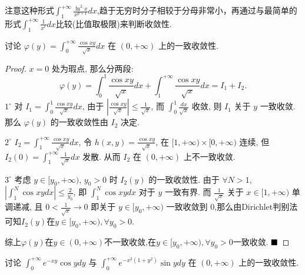 \documentclass[lang=cn,newtx,10pt,scheme=chinese]{elegantbook}
\begin{document}
\begin{note}
    注意这种形式$\int_{1}^{+\infty} \frac{\ln^2 x}{x^{p+1}} dx$,趋于无穷时分子相较于分母非常小，再通过与最简单的形式$\int_{1}^{+\infty} \frac{1}{x^{r}} dx$比较(比值取极限)来判断收敛性.
\end{note}

\begin{example}
讨论 $\varphi(y) = \int_{0}^{+\infty} \frac{\cos xy}{\sqrt{x}} dx$ 在 $(0, +\infty)$ 上的一致收敛性.
\end{example}

\begin{proof}
$x=0$ 处为瑕点, 那么分两段:
$$ \varphi(y) = \int_{0}^{1} \frac{\cos xy}{\sqrt{x}} dx + \int_{1}^{+\infty} \frac{\cos xy}{\sqrt{x}} dx = I_1 + I_2. $$
$1^{\circ}$ 对 $I_1 = \int_{0}^{1} \frac{\cos xy}{\sqrt{x}} dx$, 由于 $|\frac{\cos xy}{\sqrt{x}}| \le \frac{1}{\sqrt{x}}$, 而 $\int_{0}^{1} \frac{dx}{\sqrt{x}}$ 收敛, 则 $I_1$ 关于 $y$ 一致收敛.
那么 $\varphi(y)$ 的一致收敛性由 $I_2$ 决定.

$2^{\circ}$ $I_2 = \int_{1}^{+\infty} \frac{\cos xy}{\sqrt{x}} dx$, 令 $h(x,y) = \frac{\cos xy}{\sqrt{x}}$, 在 $[1, +\infty) \times [0, +\infty)$ 连续, 但 $I_2(0) = \int_{1}^{+\infty} \frac{1}{\sqrt{x}} dx$ 发散.
从而 $I_2$ 在 $(0, +\infty)$ 上不一致收敛.

$3^{\circ}$ 考虑 $y \in [y_0, +\infty)$, $y_0 > 0$ 时 $I_2(y)$ 的一致收敛性. 由于 $\forall N > 1$, $|\int_1^N \cos xy dx| \le \frac{2}{y_0}$, 即 $\int_1^N \cos xy dx$ 对于 $y$ 一致有界.
而 $\frac{1}{\sqrt{x}}$ 关于 $x \in [1, +\infty)$ 单调递减, 且 $0 < \frac{1}{\sqrt{x}} \to 0$ 即关于 $y \in [y_0, +\infty)$ 一致收敛到 0,那么由Dirichlet判别法可知$I_2(y)$在$y\in[y_0,+ \infty),\forall y_0>0$.

综上$\varphi(y)$在$y\in(0,+ \infty)$不一致收敛,在$y\in[y_0,+ \infty),\forall y_0>0$一致收敛.
$\hfill \blacksquare$
\end{proof}

\begin{example}
讨论 $\int_{0}^{+\infty} e^{-xy} \cos y dy$ 与 $\int_{0}^{+\infty} e^{-x^2(1+y^2)} \sin y dy$ 在 $(0, +\infty)$ 上的一致收敛性.
\end{example}
\end{document}

